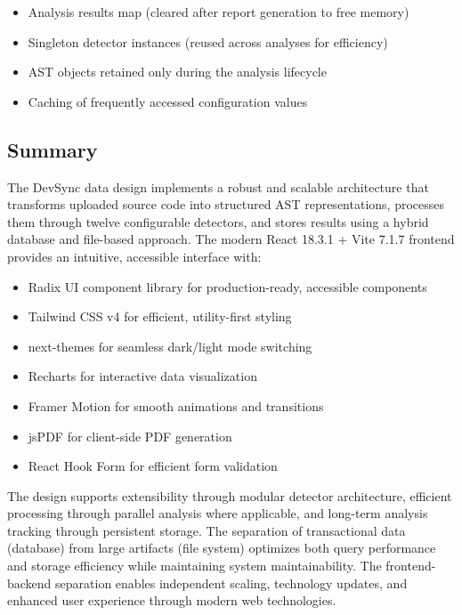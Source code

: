 \documentclass[12pt,a4paper]{article}
\begin{document}
    \begin{itemize}[leftmargin=0.5in]
        \item Analysis results map (cleared after report generation to free memory)
        \item Singleton detector instances (reused across analyses for efficiency)
        \item AST objects retained only during the analysis lifecycle
        \item Caching of frequently accessed configuration values
    \end{itemize}

    \subsection{Summary}

    The DevSync data design implements a robust and scalable architecture that transforms uploaded source code into structured AST representations, processes them through twelve configurable detectors, and stores results using a hybrid database and file-based approach. The modern React 18.3.1 + Vite 7.1.7 frontend provides an intuitive, accessible interface with:

    \begin{itemize}[leftmargin=0.5in]
        \item Radix UI component library for production-ready, accessible components
        \item Tailwind CSS v4 for efficient, utility-first styling
        \item next-themes for seamless dark/light mode switching
        \item Recharts for interactive data visualization
        \item Framer Motion for smooth animations and transitions
        \item jsPDF for client-side PDF generation
        \item React Hook Form for efficient form validation
    \end{itemize}

    The design supports extensibility through modular detector architecture, efficient processing through parallel analysis where applicable, and long-term analysis tracking through persistent storage. The separation of transactional data (database) from large artifacts (file system) optimizes both query performance and storage efficiency while maintaining system maintainability. The frontend-backend separation enables independent scaling, technology updates, and enhanced user experience through modern web technologies.
\end{document}
